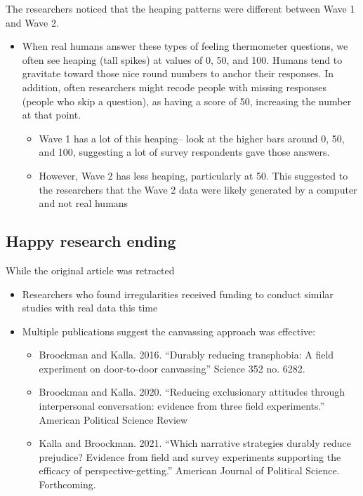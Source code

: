 \documentclass[
  letterpaper,
  DIV=11,
  numbers=noendperiod]{scrreprt}
\providecommand{\tightlist}{%
  \setlength{\itemsep}{0pt}\setlength{\parskip}{0pt}}\usepackage{longtable,booktabs,array}
\begin{document}
The researchers noticed that the heaping patterns were different between
Wave 1 and Wave 2.

\begin{itemize}
\tightlist
\item
  When real humans answer these types of feeling thermometer questions,
  we often see heaping (tall spikes) at values of 0, 50, and 100. Humans
  tend to gravitate toward those nice round numbers to anchor their
  responses. In addition, often researchers might recode people with
  missing responses (people who skip a question), as having a score of
  50, increasing the number at that point.

  \begin{itemize}
  \tightlist
  \item
    Wave 1 has a lot of this heaping-- look at the higher bars around 0,
    50, and 100, suggesting a lot of survey respondents gave those
    answers.
  \item
    However, Wave 2 has less heaping, particularly at 50. This suggested
    to the researchers that the Wave 2 data were likely generated by a
    computer and not real humans
  \end{itemize}
\end{itemize}

\hypertarget{happy-research-ending}{%
\subsection{Happy research ending}\label{happy-research-ending}}

While the original article was retracted

\begin{itemize}
\tightlist
\item
  Researchers who found irregularities received funding to conduct
  similar studies with real data this time
\item
  Multiple publications suggest the canvassing approach was effective:

  \begin{itemize}
  \tightlist
  \item
    Broockman and Kalla. 2016. ``Durably reducing transphobia: A field
    experiment on door-to-door canvassing'' Science 352 no. 6282.
  \item
    Broockman and Kalla. 2020. ``Reducing exclusionary attitudes through
    interpersonal conversation: evidence from three field experiments.''
    American Political Science Review
  \item
    Kalla and Broockman. 2021. ``Which narrative strategies durably
    reduce prejudice? Evidence from field and survey experiments
    supporting the efficacy of perspective-getting.'' American Journal
    of Political Science. Forthcoming.
  \end{itemize}
\end{itemize}
\end{document}

